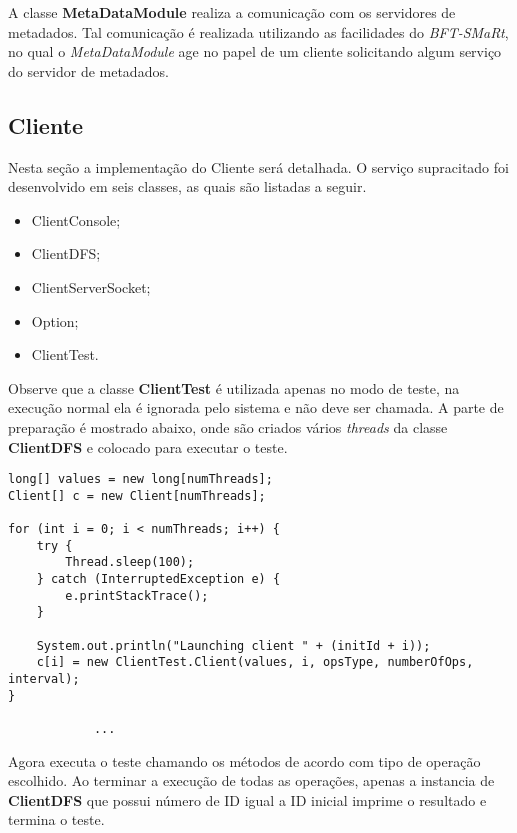 A classe \textbf{MetaDataModule} realiza a comunicação com os servidores de metadados. Tal comunicação é realizada utilizando as facilidades do \textit{BFT-SMaRt}, no qual o \textit{MetaDataModule} age no papel de um cliente solicitando algum serviço do servidor de metadados.
\\

\subsection{Cliente}
Nesta seção a implementação do Cliente será detalhada. O serviço supracitado foi desenvolvido em seis classes, as quais são listadas a seguir.
\\

\begin{itemize}
	\item ClientConsole;
	\item ClientDFS;
	\item ClientServerSocket;
	\item Option;
	\item ClientTest.
\end{itemize}

Observe que a classe \textbf{ClientTest} é utilizada apenas no modo de teste, na execução normal ela é ignorada pelo sistema e não deve ser chamada. A parte de preparação é mostrado abaixo, onde são criados vários \textit{threads} da classe \textbf{ClientDFS} e colocado para executar o teste.

\begin{lstlisting}[basicstyle=\ttfamily\footnotesize, frame=single]		
long[] values = new long[numThreads];
Client[] c = new Client[numThreads];

for (int i = 0; i < numThreads; i++) {
	try {
		Thread.sleep(100);
	} catch (InterruptedException e) {
		e.printStackTrace();
	}

	System.out.println("Launching client " + (initId + i));
	c[i] = new ClientTest.Client(values, i, opsType, numberOfOps, interval);
}
	
			...
\end{lstlisting}

Agora executa o teste chamando os métodos de acordo com tipo de  operação escolhido. 
Ao terminar a execução de todas as operações, apenas a instancia de \textbf{ClientDFS} que possui número de ID igual a ID inicial imprime o resultado e termina o teste.

